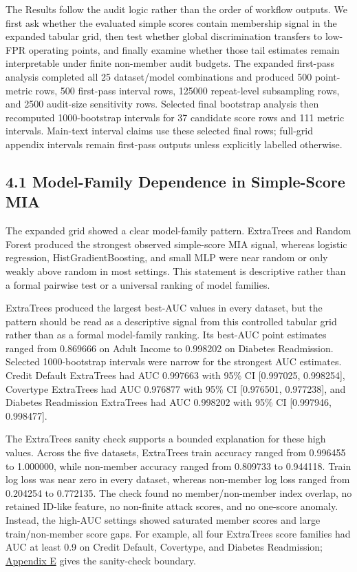 \documentclass[
  10pt,
  twocolumn]{article}
\begin{document}
The Results follow the audit logic rather than the order of workflow outputs. We first ask whether the evaluated simple scores contain membership signal in the expanded tabular grid, then test whether global discrimination transfers to low-FPR operating points, and finally examine whether those tail estimates remain interpretable under finite non-member audit budgets. The expanded first-pass analysis completed all 25 dataset/model combinations and produced 500 point-metric rows, 500 first-pass interval rows, 125000 repeat-level subsampling rows, and 2500 audit-size sensitivity rows. Selected final bootstrap analysis then recomputed 1000-bootstrap intervals for 37 candidate score rows and 111 metric intervals. Main-text interval claims use these selected final rows; full-grid appendix intervals remain first-pass outputs unless explicitly labelled otherwise.

\hypertarget{model-family-dependence-in-simple-score-mia}{%
\subsection{4.1 Model-Family Dependence in Simple-Score MIA}\label{model-family-dependence-in-simple-score-mia}}

The expanded grid showed a clear model-family pattern. ExtraTrees and Random Forest produced the strongest observed simple-score MIA signal, whereas logistic regression, HistGradientBoosting, and small MLP were near random or only weakly above random in most settings. This statement is descriptive rather than a formal pairwise test or a universal ranking of model families.

ExtraTrees produced the largest best-AUC values in every dataset, but the pattern should be read as a descriptive signal from this controlled tabular grid rather than as a formal model-family ranking. Its best-AUC point estimates ranged from 0.869666 on Adult Income to 0.998202 on Diabetes Readmission. Selected 1000-bootstrap intervals were narrow for the strongest AUC estimates. Credit Default ExtraTrees had AUC 0.997663 with 95\% CI {[}0.997025, 0.998254{]}, Covertype ExtraTrees had AUC 0.976877 with 95\% CI {[}0.976501, 0.977238{]}, and Diabetes Readmission ExtraTrees had AUC 0.998202 with 95\% CI {[}0.997946, 0.998477{]}.

The ExtraTrees sanity check supports a bounded explanation for these high values. Across the five datasets, ExtraTrees train accuracy ranged from 0.996455 to 1.000000, while non-member accuracy ranged from 0.809733 to 0.944118. Train log loss was near zero in every dataset, whereas non-member log loss ranged from 0.204254 to 0.772135. The check found no member/non-member index overlap, no retained ID-like feature, no non-finite attack scores, and no one-score anomaly. Instead, the high-AUC settings showed saturated member scores and large train/non-member score gaps. For example, all four ExtraTrees score families had AUC at least 0.9 on Credit Default, Covertype, and Diabetes Readmission; \protect\hyperlink{appendix-e-extratrees-sanity-checks}{Appendix E} gives the sanity-check boundary.
\end{document}
